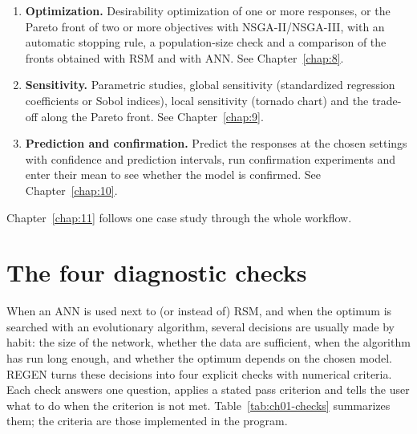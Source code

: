 \begin{enumerate}
        overlay, desirability and propagation-of-error plots of the selected model (). See
        Chapter~\ref{chap:6}.
  \item \textbf{Optimization.} Desirability optimization of one or more responses, or the Pareto front of two or
        more objectives with NSGA-II/NSGA-III, with an automatic stopping rule, a population-size check and a
        comparison of the fronts obtained with RSM and with ANN. See Chapter~\ref{chap:8}.
  \item \textbf{Sensitivity.} Parametric studies, global sensitivity (standardized regression coefficients or
        Sobol indices), local sensitivity (tornado chart) and the trade-off along the Pareto front. See Chapter~\ref{chap:9}.
  \item \textbf{Prediction and confirmation.} Predict the responses at the chosen settings with confidence and
        prediction intervals, run confirmation experiments and enter their mean to see whether the model is
        confirmed. See Chapter~\ref{chap:10}.
\end{enumerate}

Chapter~\ref{chap:11} follows one case study through the whole workflow.

\section{The four diagnostic checks}
\label{sec:ch01-checks}

When an ANN is used next to (or instead of) RSM, and when the optimum is searched with an evolutionary algorithm,
several decisions are usually made by habit: the size of the network, whether the data are sufficient, when the
algorithm has run long enough, and whether the optimum depends on the chosen model. REGEN turns these decisions
into four explicit checks with numerical criteria. Each check answers one question, applies a stated pass
criterion and tells the user what to do when the criterion is not met.
Table~\ref{tab:ch01-checks} summarizes them; the criteria are those implemented in the program.

